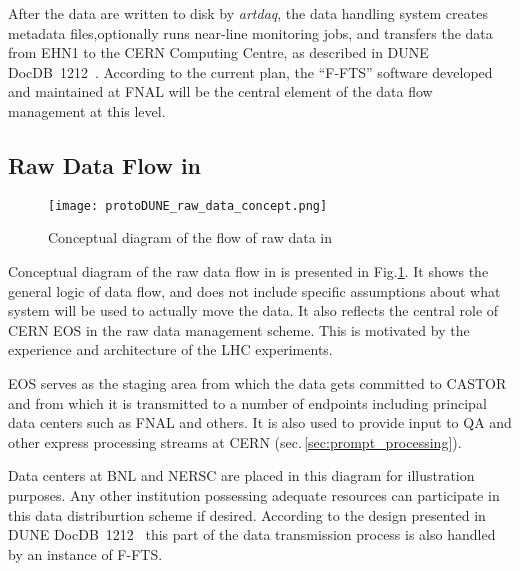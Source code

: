 After the data are written to disk by {\it artdaq}, the data handling
system creates metadata files,optionally  runs near-line monitoring jobs, and
transfers the data from EHN1 to the CERN Computing Centre, as
described in DUNE DocDB~1212~\cite{docdb1212}. According to the current plan,
the ``F-FTS'' software developed and maintained at FNAL will be the central element
of the data flow management at this level.


\subsection{Raw Data Flow in \pd}
\label{sec:raw_concept}
\begin{figure}[tbh]
\centering\texttt{[image: protoDUNE\_raw\_data\_concept.png]}
\caption{\label{fig:raw_concept}Conceptual diagram of the flow of raw data in \pd}
\end{figure}

\noindent
Conceptual diagram of the raw data flow in \pd is presented in Fig.\ref{fig:raw_concept}. It shows the general logic
of data flow, and does not include specific assumptions about what system will be used to actually move the data.
It also reflects the central role of CERN EOS in the \pd raw data management scheme. This is motivated by the experience
and architecture of the LHC experiments.

EOS serves as the staging area from which the data gets committed to CASTOR
and from which it is transmitted to a number of endpoints including principal data centers such as FNAL and others.
It is also used to provide input to QA and other express processing streams at CERN (sec.\,\ref{sec:prompt_processing}).

Data centers at BNL and NERSC are placed in this diagram for illustration purposes. Any other institution possessing adequate
resources can participate in this data distriburtion scheme if desired. According to the design presented in DUNE DocDB~1212~\cite{docdb1212}
this part of the data transmission process is also handled by an instance of F-FTS.



